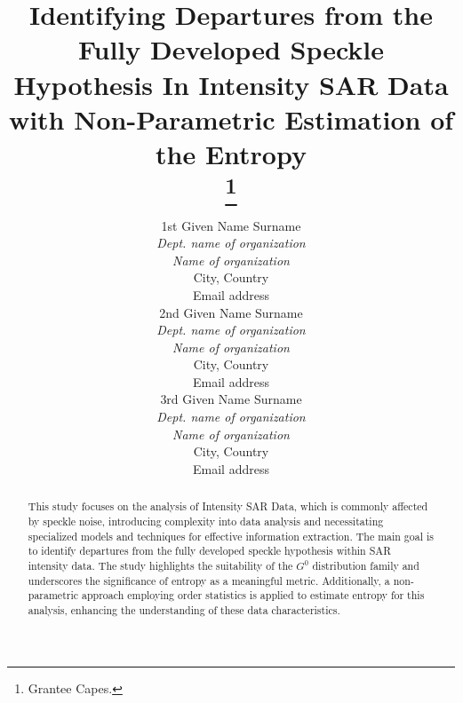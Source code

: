\documentclass[conference]{IEEEtran}
\begin{document}
\title{Identifying Departures from the Fully Developed Speckle Hypothesis In Intensity SAR Data with Non-Parametric Estimation of the Entropy\\

\thanks{Grantee Capes.}
}

\author{
\begin{minipage}[t]{0.3\textwidth}
\centering
1st Given Name Surname \\
\textit{Dept. name of organization } \\
\textit{Name of organization }\\
City, Country \\
Email address 
\end{minipage}%
\begin{minipage}[t]{0.3\textwidth}
\centering
2nd  Given Name Surname \\
\textit{Dept. name of organization } \\
\textit{Name of organization }\\
City, Country \\
Email address 
\end{minipage}%
\begin{minipage}[t]{0.3\textwidth}
\centering
3rd Given Name Surname \\
\textit{Dept. name of organization } \\
\textit{Name of organization }\\
City, Country \\
Email address 
\end{minipage}
}

\maketitle\begin{abstract}
This study focuses on the analysis of Intensity SAR Data, which is commonly affected by speckle noise, introducing complexity into data analysis and necessitating specialized models and techniques for effective information extraction. 
The main goal is to identify departures from the fully developed speckle hypothesis within SAR intensity data. 
The study highlights the suitability of the $G^0$ distribution family and underscores the significance of entropy as a meaningful metric. 
Additionally, a non-parametric approach employing order statistics is applied to estimate entropy for this analysis, enhancing the understanding of these data characteristics.
\end{abstract}
\end{document}
